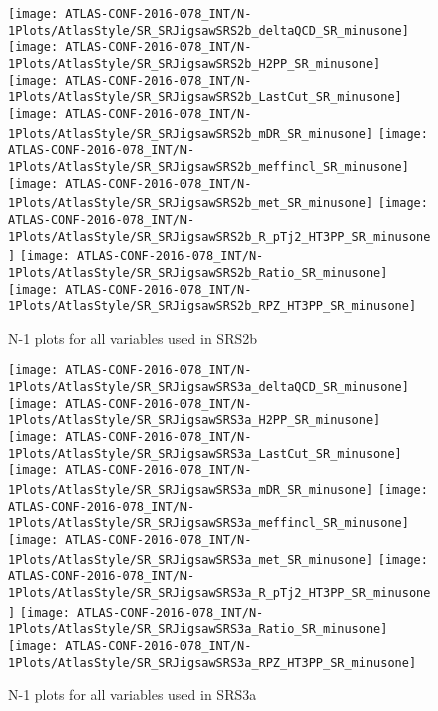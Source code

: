\clearpage
\begin{figure}[tbp]
\begin{center}
\texttt{[image: ATLAS-CONF-2016-078\_INT/N-1Plots/AtlasStyle/SR\_SRJigsawSRS2b\_deltaQCD\_SR\_minusone]}
\texttt{[image: ATLAS-CONF-2016-078\_INT/N-1Plots/AtlasStyle/SR\_SRJigsawSRS2b\_H2PP\_SR\_minusone]}
\texttt{[image: ATLAS-CONF-2016-078\_INT/N-1Plots/AtlasStyle/SR\_SRJigsawSRS2b\_LastCut\_SR\_minusone]}
\texttt{[image: ATLAS-CONF-2016-078\_INT/N-1Plots/AtlasStyle/SR\_SRJigsawSRS2b\_mDR\_SR\_minusone]}
\texttt{[image: ATLAS-CONF-2016-078\_INT/N-1Plots/AtlasStyle/SR\_SRJigsawSRS2b\_meffincl\_SR\_minusone]}
\texttt{[image: ATLAS-CONF-2016-078\_INT/N-1Plots/AtlasStyle/SR\_SRJigsawSRS2b\_met\_SR\_minusone]}
\texttt{[image: ATLAS-CONF-2016-078\_INT/N-1Plots/AtlasStyle/SR\_SRJigsawSRS2b\_R\_pTj2\_HT3PP\_SR\_minusone]}
\texttt{[image: ATLAS-CONF-2016-078\_INT/N-1Plots/AtlasStyle/SR\_SRJigsawSRS2b\_Ratio\_SR\_minusone]}
\texttt{[image: ATLAS-CONF-2016-078\_INT/N-1Plots/AtlasStyle/SR\_SRJigsawSRS2b\_RPZ\_HT3PP\_SR\_minusone]}
\end{center}
\caption{N-1 plots for all variables used in SRS2b}
\label{fig:SR_SRJigsawSRS2a_meffincl_SR_minusone}
\end{figure}

\begin{figure}[tbp]
\begin{center}
\texttt{[image: ATLAS-CONF-2016-078\_INT/N-1Plots/AtlasStyle/SR\_SRJigsawSRS3a\_deltaQCD\_SR\_minusone]}
\texttt{[image: ATLAS-CONF-2016-078\_INT/N-1Plots/AtlasStyle/SR\_SRJigsawSRS3a\_H2PP\_SR\_minusone]}
\texttt{[image: ATLAS-CONF-2016-078\_INT/N-1Plots/AtlasStyle/SR\_SRJigsawSRS3a\_LastCut\_SR\_minusone]}
\texttt{[image: ATLAS-CONF-2016-078\_INT/N-1Plots/AtlasStyle/SR\_SRJigsawSRS3a\_mDR\_SR\_minusone]}
\texttt{[image: ATLAS-CONF-2016-078\_INT/N-1Plots/AtlasStyle/SR\_SRJigsawSRS3a\_meffincl\_SR\_minusone]}
\texttt{[image: ATLAS-CONF-2016-078\_INT/N-1Plots/AtlasStyle/SR\_SRJigsawSRS3a\_met\_SR\_minusone]}
\texttt{[image: ATLAS-CONF-2016-078\_INT/N-1Plots/AtlasStyle/SR\_SRJigsawSRS3a\_R\_pTj2\_HT3PP\_SR\_minusone]}
\texttt{[image: ATLAS-CONF-2016-078\_INT/N-1Plots/AtlasStyle/SR\_SRJigsawSRS3a\_Ratio\_SR\_minusone]}
\texttt{[image: ATLAS-CONF-2016-078\_INT/N-1Plots/AtlasStyle/SR\_SRJigsawSRS3a\_RPZ\_HT3PP\_SR\_minusone]}
\end{center}
\caption{N-1 plots for all variables used in SRS3a}
\label{fig:SR_SRJigsawSRS2b_H2PP_SR_minusone}
\end{figure}

